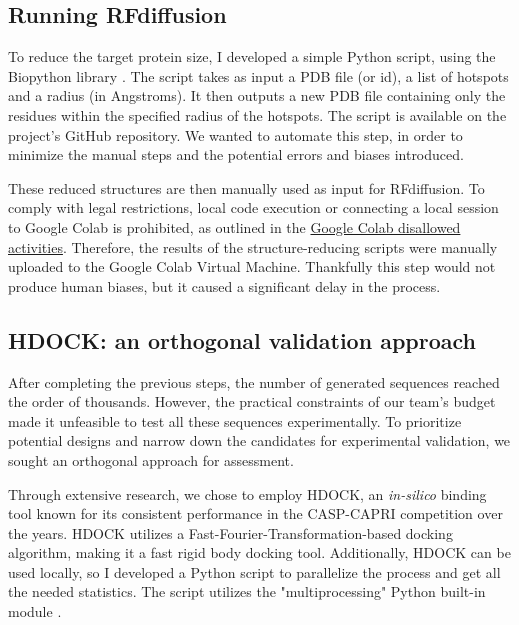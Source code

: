 \documentclass[11pt,a4paper]{article}
\begin{document}
\subsection{Running RFdiffusion}

To reduce the target protein size, I developed a simple Python script, using the Biopython library \cite{biopython}. The script takes as input a PDB file (or id), a list of hotspots and a radius (in Angstroms). It then outputs a new PDB file containing only the residues within the specified radius of the hotspots. The script is available on the project's GitHub repository. We wanted to automate this step, in order to minimize the manual steps and the potential errors and biases introduced.

These reduced structures are then manually used as input for RFdiffusion. To comply with legal restrictions, local code execution or connecting a local session to Google Colab is prohibited, as outlined in the \href{https://research.google.com/colaboratory/faq.html#disallowed-activities}{Google Colab disallowed activities}. Therefore, the results of the structure-reducing scripts were manually uploaded to the Google Colab Virtual Machine. Thankfully this step would not produce human biases, but it caused a significant delay in the process.

\subsection{HDOCK: an orthogonal validation approach}

After completing the previous steps, the number of generated sequences reached the order of thousands. However, the practical constraints of our team's budget made it unfeasible to test all these sequences experimentally. To prioritize potential designs and narrow down the candidates for experimental validation, we sought an orthogonal approach for assessment.

Through extensive research, we chose to employ HDOCK, an \emph{in-silico} binding tool \cite{yan2017hdock} known for its consistent performance in the CASP-CAPRI \cite{casp-capri} competition over the years. HDOCK utilizes a Fast-Fourier-Transformation-based docking algorithm, making it a fast rigid body docking tool. Additionally, HDOCK can be used locally, so I developed a Python script to parallelize the process and get all the needed statistics. The script utilizes the "multiprocessing" Python built-in module \cite{python_multiprocessing}.
\end{document}
